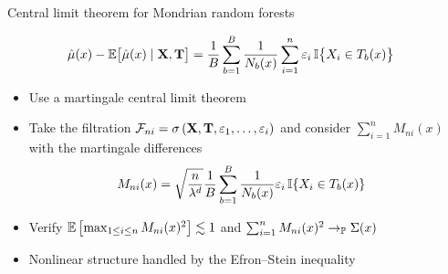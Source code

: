\documentclass{beamer}
\begin{document}
\begin{frame}{Central limit theorem for Mondrian random forests}

  \begin{align*}
    \hat \mu(x)
    - \E \big[ \hat \mu(x) \mid \bX, \bT \big]
    &=
    \frac{1}{B} \sum_{b=1}^B
    \frac{1}{N_b(x)}
    \sum_{i=1}^n \varepsilon_i \,
    \I\big\{ X_i \in T_b(x) \big\}
  \end{align*}
  \vspace*{-3mm}
  \begin{itemize}
    \item Use a \alert{martingale central limit theorem}
      \citep{hall1980martingale}
    \item Take the filtration
      $\cF_{n i} =
      \sigma \left( \bX, \bT, \varepsilon_1, \ldots, \varepsilon_i \right)$
      and consider $\sum_{i=1}^n M_{n i}(x)$
      with the martingale differences
      \begin{align*}
        M_{n i}(x)
        &=
        \sqrt{\frac{n}{\lambda^d}}
        \frac{1}{B} \sum_{b=1}^B
        \frac{1} {N_{b}(x)}
        \varepsilon_i \,
        \I\{X_i \in T_b(x)\}
      \end{align*}
    \item
      Verify
      $\E\left[\max_{1 \leq i \leq n} M_{n i}(x)^2\right] \lesssim 1$
      and $\sum_{i=1}^n M_{n i}(x)^2 \to_\P \Sigma(x)$
    \item
      Nonlinear structure handled by
      the Efron--Stein inequality
  \end{itemize}

\end{frame}
\end{document}
